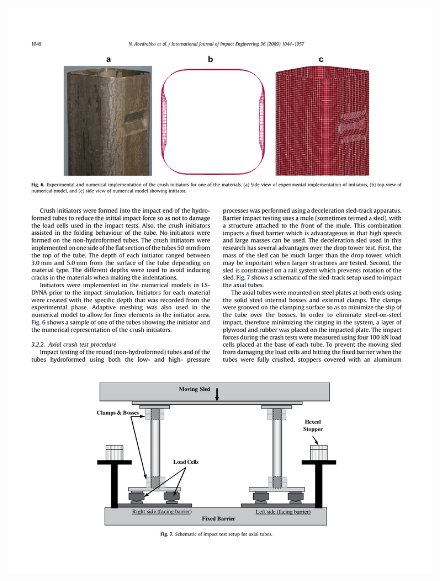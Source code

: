 \documentclass[
documentsize = a4, %
font = cmr, %
typesize = 11, %
printmode = true,
onehalfspacing = true,
language = en, %
titlepage = udciccp, %
degree = pt, %
dedication = true,
acknowledgements = true,
abstract-en = true,
abstract-es = false,
abstract-ga = false,
epigraphs = true,
toc = true,
lof = true,
lot = true,
frontmatterintoc = false,
notation = false,
minimal = false,
]{UDCthesis}
\begin{document}
\begin{figure}
	\centering
	\begin{minipage}[b]{.23\linewidth}
		\centering
		\includegraphics[width=\linewidth]{IMG_CUTRES/abedrabbo_trigger}
	\end{minipage}
	\quad
	\begin{minipage}[b]{.23\linewidth}
		\centering

\end{minipage}
\end{figure}
\end{document}
